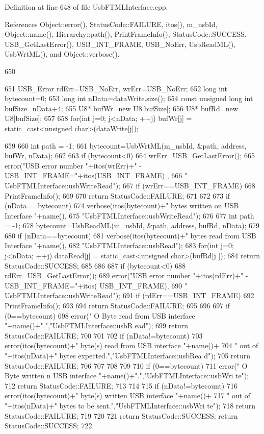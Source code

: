 Definition at line 648 of file UsbFTMLInterface.cpp.

References Object::error(), StatusCode::FAILURE, itos(), m\_\-usbId, Object::name(), Hierarchy::path(), PrintFrameInfo(), StatusCode::SUCCESS, USB\_\-GetLastError(), USB\_\-INT\_\-FRAME, USB\_\-NoErr, UsbReadML(), UsbWrtML(), and Object::verbose().


\begin{DoxyCode}
650                                                                     {
651   USB_Error rdErr=USB_NoErr, wrErr=USB_NoErr;
652   long int bytecount=0;
653   long int nData=dataWrite.size();
654   const unsigned long int bufSize=nData+4;
655   U8* bufWr=new U8[bufSize];
656   U8* bufRd=new U8[bufSize];
657 
658   for(int j=0; j<nData; ++j) bufWr[j] = static_cast<unsigned char>(dataWrite[j]);
      
659 
660   int path = -1;
661   bytecount=UsbWrtML(m_usbId, &path, address, bufWr, nData);
662 
663   if (bytecount<0){
664     wrErr=USB_GetLastError();
665     error("USB error number "+itos(wrErr)+" - USB_INT_FRAME="+itos(USB_INT_FRAME)
      ,
666             " UsbFTMLInterface::usbWriteRead");
667     if (wrErr==USB_INT_FRAME){
668       PrintFrameInfo();
669     } 
670     return StatusCode::FAILURE;
671   }
672 
673   if (nData==bytecount){
674     verbose(itos(bytecount)+" bytes written on USB Interface "+name(),
675             "UsbFTMLInterface::usbWriteRead");
676 
677     int path = -1;
678     bytecount=UsbReadML(m_usbId, &path, address, bufRd, nData);
679 
680     if (nData==bytecount){
681       verbose(itos(bytecount)+" bytes read from USB Interface "+name(),
682               "UsbFTMLInterface::usbRead");
683       for(int j=0; j<nData; ++j) dataRead[j] = static_cast<unsigned char>(bufRd[j
      ]);
684       return StatusCode::SUCCESS;
685     }
686 
687     if (bytecount<0){
688       rdErr=USB_GetLastError();
689       error("USB error number "+itos(rdErr)+" - USB_INT_FRAME="+itos(
      USB_INT_FRAME),
690               " UsbFTMLInterface::usbWriteRead");
691       if (rdErr==USB_INT_FRAME){
692         PrintFrameInfo();
693       } 
694       return StatusCode::FAILURE;
695     }
696   
697     if (0==bytecount){
698       error(" O Byte read from USB interface "+name()+".","UsbFTMLInterface::usbR
      ead");
699       return StatusCode::FAILURE;
700     }
701 
702     if (nData!=bytecount){
703       error(itos(bytecount)+" byte(s) read from USB interface "+name()+
704               " out of "+itos(nData)+" bytes expected.","UsbFTMLInterface::usbRea
      d");
705       return StatusCode::FAILURE;    
706     } 
707   }
708   
709   
710   if (0==bytecount){
711     error(" O Byte written n USB interface "+name()+".","UsbFTMLInterface::usbWri
      te");
712     return StatusCode::FAILURE;
713   }
714 
715   if (nData!=bytecount){
716     error(itos(bytecount)+" byte(s) written USB interface "+name()+
717             " out of "+itos(nData)+" bytes to be sent.","UsbFTMLInterface::usbWri
      te");
718     return StatusCode::FAILURE;    
719   }
720 
721   return StatusCode::SUCCESS;    return StatusCode::SUCCESS;  
722 }
\end{DoxyCode}
